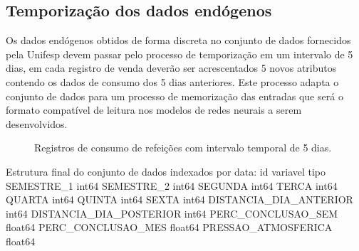 \documentclass[	12pt, Times, openright, twoside, a4paper, english, brazil]{abntex2}
\begin{document}
	\subsection{Temporização dos dados endógenos}
        Os dados endógenos obtidos de forma discreta no conjunto de dados fornecidos pela Unifesp devem passar pelo processo de temporização em um intervalo de 5 dias, em cada registro de venda deverão ser acrescentados 5 novos atributos contendo os dados de consumo dos 5 dias anteriores. Este processo adapta o conjunto de dados para um processo de memorização das entradas que será o formato compatível de leitura nos modelos de redes neurais a serem desenvolvidos.
        \begin{figure}[!ht]
    		\caption{Registros de consumo de refeições com intervalo temporal de 5 dias.\label{fig:entr_almoco_offset}}
	    \end{figure}
        Estrutura final do conjunto de dados indexados por data: \newline
        id	variavel					tipo 	SEMESTRE\_1					int64 	SEMESTRE\_2					int64 	SEGUNDA						int64 	TERCA						int64 	QUARTA						int64 	QUINTA						int64 	SEXTA						int64 	DISTANCIA\_DIA\_ANTERIOR		int64 	DISTANCIA\_DIA\_POSTERIOR		int64 	PERC\_CONCLUSAO\_SEM			float64 	PERC\_CONCLUSAO\_MES			float64 	PRESSAO\_ATMOSFERICA			float64 \newline 
\end{document}
